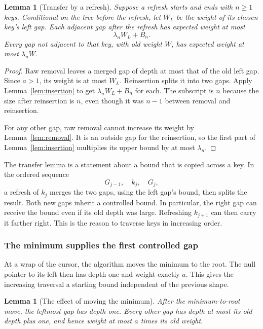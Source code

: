 \documentclass[11pt,a4paper]{article}
\theoremstyle{readable}
\newtheorem{lemma}[theorem]{Lemma}
\begin{document}
\begin{lemma}[Transfer by a refresh]
\label{lem:refresh}
Suppose a refresh starts and ends with $n\ge1$ keys. Conditional on
the tree before the refresh, let $W_L$ be the weight of its chosen
key's left gap. Each adjacent gap after the refresh has expected
weight at most
\[
  \lambda_n W_L+B_n.
\]
Every gap not adjacent to that key, with old weight $W$, has expected
weight at most $\lambda_nW$.
\end{lemma}

\begin{proof}
Raw removal leaves a merged gap of depth at most that of the old left
gap. Since $a>1$, its weight is at most $W_L$. Reinsertion splits it
into two gaps. Apply Lemma~\ref{lem:insertion} to get
$\lambda_nW_L+B_n$ for each. The subscript is $n$ because the size
after reinsertion is $n$, even though it was $n-1$ between removal
and reinsertion.

For any other gap, raw removal cannot increase its weight by
Lemma~\ref{lem:removal}. It is an outside gap for the reinsertion,
so the first part of Lemma~\ref{lem:insertion} multiplies its upper
bound by at most $\lambda_n$.
\end{proof}

The transfer lemma is a statement about a bound that is copied across
a key. In the ordered sequence
\[
  G_{j-1},\quad k_j,\quad G_j,
\]
a refresh of $k_j$ merges the two gaps, using the left gap's bound,
then splits the result. Both new gaps inherit a controlled bound.
In particular, the right gap can receive the bound even if its old
depth was large. Refreshing $k_{j+1}$ can then carry it farther right.
This is the reason to traverse keys in increasing order.

\subsubsection*{The minimum supplies the first controlled gap}
At a wrap of the cursor, the algorithm moves the minimum to the root.
The null pointer to its left then has depth one and weight exactly $a$.
This gives the increasing traversal a starting bound independent of
the previous shape.

\begin{lemma}[The effect of moving the minimum]
\label{lem:reset}
After the minimum-to-root move, the leftmost gap has depth one.
Every other gap has depth at most its old depth plus one, and hence
weight at most $a$ times its old weight.
\end{lemma}
\end{document}
